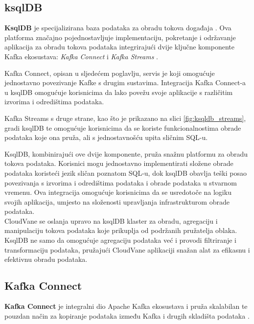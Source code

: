 \documentclass[times, utf8, diplomski]{fer}
\begin{document}
\subsection{ksqlDB}
\label{sec:ksql}

\textbf{KsqlDB} je specijalizirana baza podataka za obradu tokova događaja . Ova platforma značajno pojednostavljuje implementaciju, pokretanje i održavanje aplikacija za obradu tokova podataka integrirajući dvije ključne komponente Kafka ekosustava: \emph{Kafka Connect} i \emph{Kafka Streams} \citep{seymour_mastering_2021}.

Kafka Connect, opisan u sljedećem poglavlju, servis je koji omogućuje jednostavno povezivanje Kafke s drugim sustavima. Integracija Kafka Connect-a u ksqlDB omogućuje korisnicima da lako povežu svoje aplikacije s različitim izvorima i odredištima podataka.

Kafka Streams s druge strane, kao što je prikazano na slici \ref{fig:ksqldb_streams}, gradi ksqlDB te omogućuje korisnicima da se koriste funkcionalnostima obrade podataka koje ona pruža, ali s jednostavnošću upita sličnim SQL-u.

KsqlDB, kombinirajući ove dvije komponente, pruža snažnu platformu za obradu tokova podataka. Korisnici mogu jednostavno implementirati složene obrade podataka koristeći jezik sličan poznatom SQL-u, dok ksqlDB obavlja teški posao povezivanja s izvorima i odredištima podataka i obrade podataka u stvarnom vremenu. Ova integracija omogućuje korisnicima da se usredotoče na logiku svojih aplikacija, umjesto na složenosti upravljanja infrastrukturom obrade podataka. \\

CloudVane se oslanja upravo na ksqlDB klaster za obradu, agregaciju i manipulaciju tokova podataka koje prikuplja od podržanih pružatelja oblaka. KsqlDB ne samo da omogućuje agregaciju podataka već i provodi filtriranje i transformaciju podataka, pružajući CloudVane aplikaciji snažan alat za efikasnu i efektivnu obradu podataka.


\subsection{Kafka Connect}
\label{sec:connect}

\textbf{Kafka Connect} je integralni dio Apache Kafka ekosustava i pruža skalabilan te pouzdan način za kopiranje podataka između Kafka i drugih skladišta podataka \citep{shapira_kafka_2021}.
\end{document}
